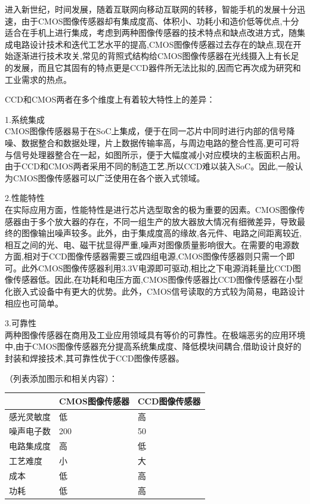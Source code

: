 进入新世纪，时间发展，随着互联网向移动互联网的转移，智能手机的发展十分迅速，由于CMOS图像传感器却有集成度高、体积小、功耗小和造价低等优点,十分适合在手机上进行集成，考虑到两种图像传感器的技术特点和缺点改进方式，随集成电路设计技术和迭代工艺水平的提高,CMOS图像传感器过去存在的缺点,现在开始逐渐进行技术攻关,常见的背照式结构给CMOS图像传感器在光线摄入上有长足的发展，而且它其固有的特点更是CCD器件所无法比拟的,因而它再次成为研究和工业需求的热点。

CCD和CMOS两者在多个维度上有着较大特性上的差异：

1.系统集成 \\
CMOS图像传感器易于在SoC上集成，便于在同一芯片中同时进行内部的信号降噪、数据整合和数据处理，片上数据传输率高，与周边电路的整合性高,更可可将与信号处理器整合在一起，如图所示，便于大幅度减小对应模块的主板面积占用。由于CCD和CMOS两者采用不同的制造工艺,所以CCD难以装入SoC。因此,一般认为CMOS图像传感器可以广泛使用在各个嵌入式领域。

2.性能特性\\
在实际应用方面，性能特性是进行芯片选型取舍的极为重要的因素。CMOS图像传感器由于多个放大器的存在，不同一组生产的放大器放大情况有细微差异，导致最终的图像输出噪声较多。此外，由于集成度高的缘故,各元件、电路之间距离较近,相互之间的光、电、磁干扰显得严重,噪声对图像质量影响很大。在需要的电源数方面,相对于CCD图像传感器需要三或四组电源,CMOS图像传感器则只需一个即可。此外CMOS图像传感器利用3.3V电源即可驱动,相比之下电源消耗量比CCD图像传感器低。因此,在功耗和电压方面,CMOS图像传感器比CCD图像传感器在小型化嵌入式设备中有更大的优势。此外，CMOS信号读取的方式较为简易，电路设计相应也可简单。

3.可靠性\\
两种图像传感器在商用及工业应用领域具有等价的可靠性。在极端恶劣的应用环境中,由于CMOS图像传感器充分提高系统集成度、降低模块间耦合,借助设计良好的封装和焊接技术,其可靠性优于CCD图像传感器。

（列表添加图示和相关内容）：
\begin{table}[ht]
	
\begin{tabular}{|L{2.2cm}|C{4cm}|R{4cm}|}
\toprule[1pt]
\hline
	& CMOS图像传感器 & CCD图像传感器 \\ \hline
	感光灵敏度 & 低 & 高 \\ \hline
	噪声电子数 & 200 & 50 \\ \hline
	电路集成度 & 高 & 低 \\ \hline
	工艺难度 & 小 & 大 \\ \hline
	成本 & 低 & 高 \\ \hline
	功耗 & 低 & 高 \\  \hline
\end{tabular} 
\end{table}

